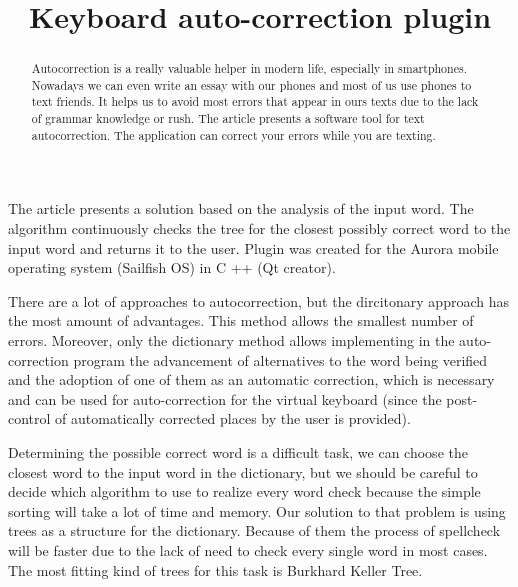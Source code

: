 \documentclass[conference]{IEEEtran}
\begin{document}
\title{	Keyboard auto-correction plugin}
\date{}%

\author{
}
\maketitle

\begin{abstract}
 Autocorrection is a really valuable helper in modern life, especially in smartphones. Nowadays we can even write an essay with our phones and most of us use phones to text friends. It helps us to avoid most errors that appear in ours texts due to the lack of grammar knowledge or rush.
The article presents a software tool for text autocorrection. The application can correct your errors while you are texting. 
\end{abstract}

\medskip
The article presents a solution based on the analysis of the input word.
The algorithm continuously checks the tree for the closest possibly correct word to the input word and returns it to the user. Plugin was created for the Aurora mobile operating system (Sailfish OS) in C ++ (Qt creator).


There are a lot of approaches to autocorrection, but the dircitonary approach has the most amount of advantages. This method allows the smallest number of errors. Moreover, only the dictionary method allows implementing in the auto-correction program the advancement of alternatives to the word being verified and the adoption of one of them as an automatic correction, which is necessary and can be used for auto-correction for the virtual keyboard (since the post-control of automatically corrected places by the user is provided).

Determining the possible correct word is a difficult task, we can choose the closest word to the input word in the dictionary, but we should be careful to decide which algorithm to use to realize every word check because the simple sorting will take a lot of time and memory. Our solution to that problem is using trees as a structure for the dictionary. Because of them the process of spellcheck will be faster due to the 
lack of need to check every single word in most cases. The most fitting kind of trees for this task is Burkhard Keller Tree. 
\end{document}
